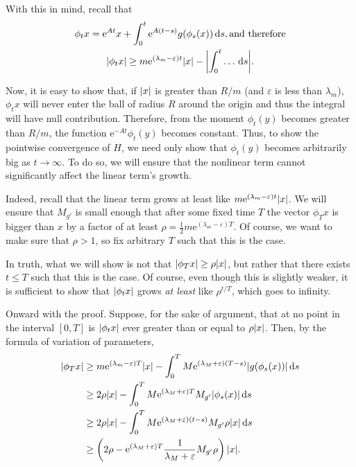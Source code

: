 \documentclass{article}
\newcommand{\e}{\mathrm{e}}
\DeclarePairedDelimiter{\abs}{\lvert}{\rvert}
\begin{document}
With this in mind, recall that
\begin{gather*}
\phi_t x = \e^{A t} x + \int_0^t \e^{A (t-s)} g(\phi_s(x)) \dl s, \text{and therefore}\\
\abs{\phi_t x} \geq m \e^{(\lambda_m - \varepsilon) t} \abs{x} - \abs*{\int_0^t \dots \dl s}.
\end{gather*}

Now, it is easy to show that, if $\abs{x}$ is greater than $R/m$ (and $\varepsilon$ is less than $\lambda_m$), $\phi_t x$ will never enter the ball of radius $R$ around the origin and thus the integral will have null contribution. Therefore, from the moment $\phi_t(y)$ becomes greater than $R/m$, the function $\e^{-A t} \phi_t(y)$ becomes constant. Thus, to show the pointwise convergence of $H$, we need only show that $\phi_t(y)$ becomes arbitrarily big as $t \to \infty$. To do so, we will ensure that the nonlinear term cannot significantly affect the linear term's growth.

Indeed, recall that the linear term grows at least like $m \e^{(\lambda_m - \varepsilon) t} \abs{x}$. We will ensure that $M_{g'}$ is small enough that after some fixed time $T$ the vector $\phi_T x$ is bigger than $x$ by a factor of at least $\rho = \frac12 m \e^{(\lambda_m - \varepsilon) T}$. Of course, we want to make sure that $\rho > 1$, so fix arbitrary $T$ such that this is the case.

In truth, what we will show is not that $\abs{\phi_T x} \geq \rho \abs x$, but rather that there exists $t \leq T$ such that this is the case. Of course, even though this is slightly weaker, it is sufficient to show that $\abs{\phi_t x}$ grows \emph{at least} like $\rho^{t/T}$, which goes to infinity.

Onward with the proof. Suppose, for the sake of argument, that at no point in the interval $[0, T]$ is $\abs{\phi_t x}$ ever greater than or equal to $\rho \abs x$. Then, by the formula of variation of parameters,
\begin{align*}
\abs{\phi_T x} &\geq m \e^{(\lambda_m - \varepsilon) T} \abs{x} - \int_0^T M \e^{(\lambda_M + \varepsilon)(T-s)} \abs{g(\phi_s(x))} \dl s\\
&\geq 2\rho \abs{x} - \int_0^T M \e^{(\lambda_M + \varepsilon)T} M_{g'} \abs{\phi_s(x)} \dl s\\
&\geq 2\rho \abs{x} - \int_0^T M \e^{(\lambda_M + \varepsilon)(t-s)} M_{g'} \rho \abs{x} \dl s\\
&\geq \left( 2\rho - \e^{(\lambda_M + \varepsilon)T} \frac1{\lambda_M + \varepsilon} M_{g'} \rho \right) \abs{x}.
\end{align*}
\end{document}
